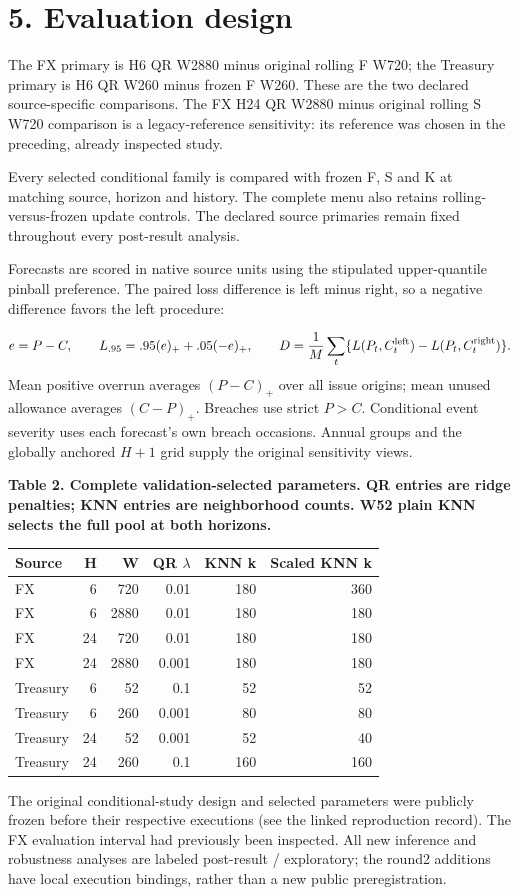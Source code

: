 \documentclass[10pt,a4paper]{article}
\begin{document}
\section*{5. Evaluation design}
The FX primary is H6 QR W2880 minus original rolling F W720; the Treasury primary is H6 QR W260 minus frozen F W260. These are the two declared source-specific comparisons. The FX H24 QR W2880 minus original rolling S W720 comparison is a legacy-reference sensitivity: its reference was chosen in the preceding, already inspected study.

Every selected conditional family is compared with frozen F, S and K at matching source, horizon and history. The complete menu also retains rolling-versus-frozen update controls. The declared source primaries remain fixed throughout every post-result analysis.

Forecasts are scored in native source units using the stipulated upper-quantile pinball preference. The paired loss difference is left minus right, so a negative difference favors the left procedure:

\[
e=P-C,\qquad L_{.95}=.95(e)_+ +.05(-e)_+,\qquad D=\frac1M\sum_t\{L(P_t,C_t^{\rm left})-L(P_t,C_t^{\rm right})\}.
\]
Mean positive overrun averages \((P-C)_+\) over all issue origins; mean unused allowance averages \((C-P)_+\). Breaches use strict \(P>C\). Conditional event severity uses each forecast's own breach occasions. Annual groups and the globally anchored \(H+1\) grid supply the original sensitivity views.

\begin{center}
\begin{minipage}{\linewidth}
\small\textbf{Table 2. Complete validation-selected parameters. QR entries are ridge penalties; KNN entries are neighborhood counts. W52 plain KNN selects the full pool at both horizons.}\par\medskip
\centering\fontsize{8}{10}\selectfont
\begin{tabular}{lrrrrr}
\toprule
Source & H & W & QR \(\lambda\) & KNN k & Scaled KNN k \\
\midrule
FX & 6 & 720 & 0.01 & 180 & 360 \\
FX & 6 & 2880 & 0.01 & 180 & 180 \\
FX & 24 & 720 & 0.01 & 180 & 180 \\
FX & 24 & 2880 & 0.001 & 180 & 180 \\
Treasury & 6 & 52 & 0.1 & 52 & 52 \\
Treasury & 6 & 260 & 0.001 & 80 & 80 \\
Treasury & 24 & 52 & 0.001 & 52 & 40 \\
Treasury & 24 & 260 & 0.1 & 160 & 160 \\
\bottomrule
\end{tabular}
\end{minipage}
\end{center}
The original conditional-study design and selected parameters were publicly frozen before their respective executions (see the linked reproduction record). The FX evaluation interval had previously been inspected. All new inference and robustness analyses are labeled post-result / exploratory; the round2 additions have local execution bindings, rather than a new public preregistration.
\end{document}
